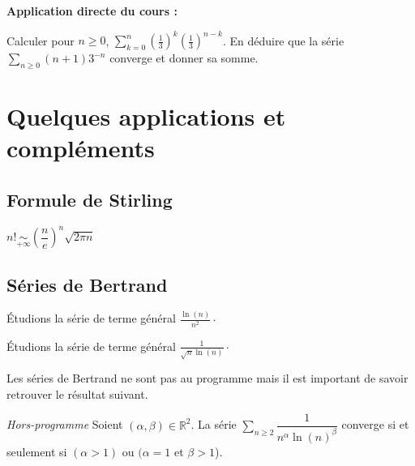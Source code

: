 \documentclass[french,11pt,twoside]{VcCours}
\newenvironment{ApplicationDirecte}{\textbf{Application directe du cours :}

}{}
\newcommand{\Sum}[2]{\ensuremath{\textstyle{\sum\limits_{#1}^{#2}}}}
\begin{document}
\newpage

\vspace*{7cm}

\begin{ApplicationDirecte}
Calculer pour $n \geq 0$, $\Sum{k=0}{n}  \left( \frac{1}{3} \right)^k \left( \frac{1}{3} \right)^{n-k}$. En déduire que la série $\Sum{n \geq 0}{}  (n+1)3^{-n}$ converge et donner sa somme.
\end{ApplicationDirecte}

\section{Quelques applications et compléments}
\subsection{Formule de Stirling}

\begin{Theoreme}{}
\begin{center}
$n! \underset{ + \infty}{\sim} \left( \dfrac{n}{e}\right)^n \sqrt{2 \pi n}$
\end{center}
\end{Theoreme}
\subsection{Séries de Bertrand}
\begin{Exemple} Étudions la série de terme général $\frac{\ln(n)}{n^2}\cdot$

\vspace{3cm}
\end{Exemple}

\begin{Exemple} Étudions la série de terme général $\frac{1}{\sqrt{n} \ln(n)}\cdot$

\vspace{3cm}
\end{Exemple}





Les séries de Bertrand ne sont pas au programme mais il est important de savoir retrouver le résultat suivant.

\begin{Proposition}{\emph{Hors-programme}} 
Soient $(\alpha, \beta) \in \mathbb{R}^2$. La série $\Sum{n \geq 2}{} \dfrac{1}{n^{\alpha} \ln(n)^{\beta}}$ converge si et seulement si $(\alpha > 1)$ ou $(\alpha = 1$ et $\beta >1$).
\end{Proposition}
\end{document}

